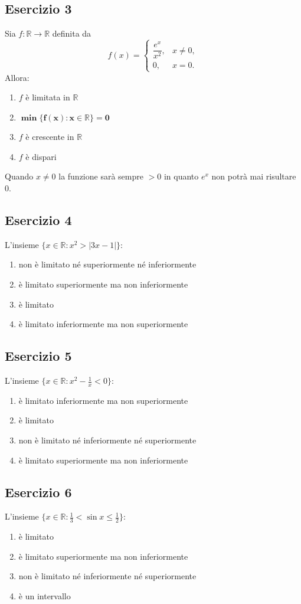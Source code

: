 \documentclass[12pt,a4paper]{article}
\begin{document}
\subsection*{Esercizio 3}
Sia $f : \mathbb{R} \to \mathbb{R}$ definita da
\[
f(x) = 
\begin{cases}
\dfrac{e^x}{x^2}, & x \neq 0, \\
0, & x = 0.
\end{cases}
\]
Allora:
\begin{enumerate}
  \item $f$ è limitata in $\mathbb{R}$
  \item $\bm{\min\{f(x) : x \in \mathbb{R}\} = 0}$
  \item $f$ è crescente in $\mathbb{R}$
  \item $f$ è dispari\\
\end{enumerate}
Quando $x \ne 0$ la funzione sarà sempre $>0$ in quanto $e^x$ non potrà mai risultare $0$.

\subsection*{Esercizio 4}
L’insieme $\{x \in \mathbb{R} : x^2 > |3x - 1|\}$:
\begin{enumerate}
  \item non è limitato né superiormente né inferiormente
  \item è limitato superiormente ma non inferiormente
  \item è limitato
  \item è limitato inferiormente ma non superiormente
\end{enumerate}

\subsection*{Esercizio 5}
L’insieme $\{x \in \mathbb{R} : x^2 - \tfrac{1}{x} < 0\}$:
\begin{enumerate}
  \item è limitato inferiormente ma non superiormente
  \item è limitato
  \item non è limitato né inferiormente né superiormente
  \item è limitato superiormente ma non inferiormente
\end{enumerate}

\subsection*{Esercizio 6}
L’insieme $\{x \in \mathbb{R} : \tfrac{1}{3} < \sin x \le \tfrac{1}{2}\}$:
\begin{enumerate}
  \item è limitato
  \item è limitato superiormente ma non inferiormente
  \item non è limitato né inferiormente né superiormente
  \item è un intervallo
\end{enumerate}
\end{document}
